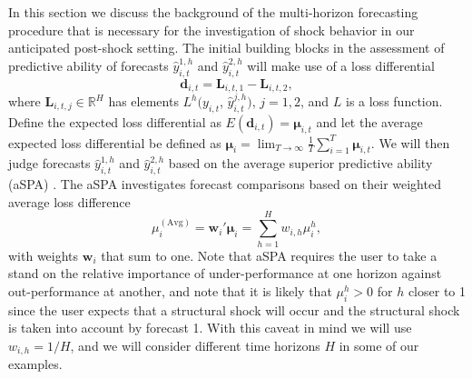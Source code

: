 \documentclass[11pt]{article}
\newcommand{\R}{\mathbb{R}}
\newcommand{\dbf}{\textbf{d}}
\newcommand{\Llet}{\textbf{L}}
\def\mbf#1{\mathbf{#1}} %
\theoremstyle{definition}
\begin{document}
In this section we discuss the background of the multi-horizon forecasting procedure \citep{quaedvlieg2021multi} that is necessary for the investigation of shock behavior in our anticipated post-shock setting. The initial building blocks in the assessment of predictive ability of forecasts $\hat y^{1,h}_{i,t}$ and $\hat y^{2,h}_{i,t}$ will make use of a loss differential
$$
  \dbf_{i,t} = \Llet_{i,t,1} - \Llet_{i,t,2},
$$
where $\Llet_{i,t,j} \in \R^H$ has elements $L^h(y_{i,t}$, $\hat y_{i,t}^{j,h})$, $j = 1,2$, and $L$ is a loss function. Define the expected loss differential as  $E(\dbf_{i,t}) = \mbf\mu_{i,t}$ and let the average expected loss differential be defined as $\mathbf{\mu}_i = \lim_{T\to\infty}\frac{1}{T}\sum_{i=1}^T \mathbf{\mu}_{i,t}$.
We will then judge forecasts $\hat y^{1,h}_{i,t}$ and $\hat y^{2,h}_{i,t}$ based on the average superior predictive ability (aSPA) \citep{quaedvlieg2021multi}. The aSPA investigates forecast comparisons based on their weighted average loss difference
$$
  \mu^{(\text{Avg})}_i = \textbf{w}_i'\mathbf{\mu}_i = \sum_{h=1}^H w_{i,h} \mu_i^h,
$$
with weights $\textbf{w}_i$ that sum to one. Note that aSPA requires the user to take a stand on the relative importance of under-performance at one horizon against out-performance at another, and note that it is likely that $\mu_i^h > 0$ for $h$ closer to 1 since the user expects that a structural shock will occur and the structural shock is taken into account by forecast 1. With this caveat in mind we will use $w_{i,h} = 1/H$, and we will consider different time horizons $H$ in some of our examples.
\end{document}
